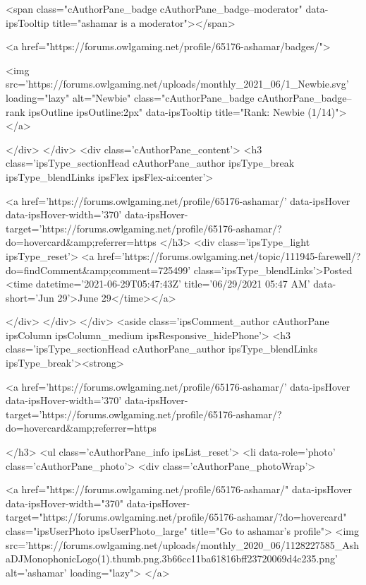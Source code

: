 				
				<span class="cAuthorPane_badge cAuthorPane_badge--moderator" data-ipsTooltip title="ashamar is a moderator"></span>
				
				
					<a href="https://forums.owlgaming.net/profile/65176-ashamar/badges/">
						
<img src='https://forums.owlgaming.net/uploads/monthly_2021_06/1_Newbie.svg' loading="lazy" alt="Newbie" class="cAuthorPane_badge cAuthorPane_badge--rank ipsOutline ipsOutline:2px" data-ipsTooltip title="Rank: Newbie (1/14)">
					</a>
				
			</div>
		</div>
		<div class='cAuthorPane_content'>
			<h3 class='ipsType_sectionHead cAuthorPane_author ipsType_break ipsType_blendLinks ipsFlex ipsFlex-ai:center'>
				


<a href='https://forums.owlgaming.net/profile/65176-ashamar/' data-ipsHover data-ipsHover-width='370' data-ipsHover-target='https://forums.owlgaming.net/profile/65176-ashamar/?do=hovercard&amp;referrer=https%
			</h3>
			<div class='ipsType_light ipsType_reset'>
				<a href='https://forums.owlgaming.net/topic/111945-farewell/?do=findComment&amp;comment=725499' class='ipsType_blendLinks'>Posted <time datetime='2021-06-29T05:47:43Z' title='06/29/2021 05:47  AM' data-short='Jun 29'>June 29</time></a>
				
			</div>
		</div>
	</div>
	<aside class='ipsComment_author cAuthorPane ipsColumn ipsColumn_medium ipsResponsive_hidePhone'>
		<h3 class='ipsType_sectionHead cAuthorPane_author ipsType_blendLinks ipsType_break'><strong>


<a href='https://forums.owlgaming.net/profile/65176-ashamar/' data-ipsHover data-ipsHover-width='370' data-ipsHover-target='https://forums.owlgaming.net/profile/65176-ashamar/?do=hovercard&amp;referrer=https%
			
		</h3>
		<ul class='cAuthorPane_info ipsList_reset'>
			<li data-role='photo' class='cAuthorPane_photo'>
				<div class='cAuthorPane_photoWrap'>
					


	<a href="https://forums.owlgaming.net/profile/65176-ashamar/" data-ipsHover data-ipsHover-width="370" data-ipsHover-target="https://forums.owlgaming.net/profile/65176-ashamar/?do=hovercard" class="ipsUserPhoto ipsUserPhoto_large" title="Go to ashamar's profile">
		<img src='https://forums.owlgaming.net/uploads/monthly_2020_06/1128227585_AshaDJMonophonicLogo(1).thumb.png.3b66cc11ba61816bff23720069d4c235.png' alt='ashamar' loading="lazy">
	</a>

